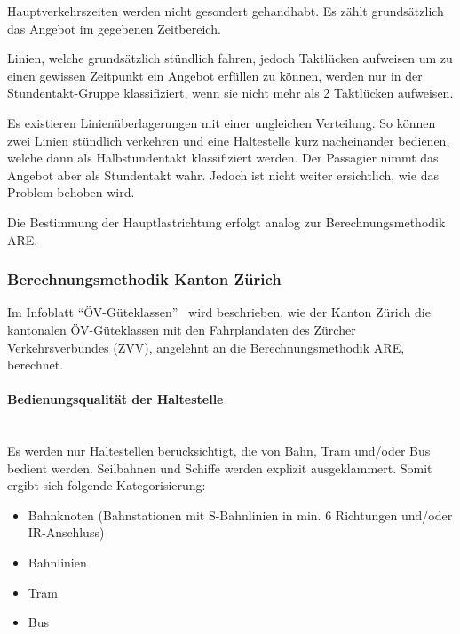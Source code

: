 Hauptverkehrszeiten werden nicht gesondert gehandhabt.
Es zählt grundsätzlich das Angebot im gegebenen Zeitbereich.

Linien, welche grundsätzlich stündlich fahren, jedoch Taktlücken aufweisen um zu einen gewissen Zeitpunkt ein Angebot erfüllen zu können, werden nur in der Stundentakt-Gruppe klassifiziert, wenn sie nicht mehr als 2 Taktlücken aufweisen.

Es existieren Linienüberlagerungen mit einer ungleichen Verteilung.
So können zwei Linien stündlich verkehren und eine Haltestelle kurz nacheinander bedienen, welche dann als Halbstundentakt klassifiziert werden.
Der Passagier nimmt das Angebot aber als Stundentakt wahr.
Jedoch ist nicht weiter ersichtlich, wie das Problem behoben wird.

Die Bestimmung der Hauptlastrichtung erfolgt analog zur Berechnungsmethodik ARE.


\subsubsection{Berechnungsmethodik Kanton Zürich}
\label{Lösungsansätze:Berechnungsmethodik Kanton Zürich}
Im Infoblatt "`ÖV-Güteklassen"'~\cite{oev-guteklassen-zh} wird beschrieben, wie der Kanton Zürich die kantonalen ÖV-Güteklassen mit den Fahrplandaten des Zürcher Verkehrsverbundes (ZVV), angelehnt an die Berechnungsmethodik \acs{ARE}, berechnet.

\paragraph{Bedienungsqualität der Haltestelle}~\\
\label{Berechnungsmethodik Kanton Zürich:Bedienungsqualität der Haltestelle}
Es werden nur Haltestellen berücksichtigt, die von Bahn, Tram und/oder Bus bedient werden.
Seilbahnen und Schiffe werden explizit ausgeklammert.
Somit ergibt sich folgende Kategorisierung:
\begin{itemize}
    \itemsep -1.5em
    \item Bahnknoten (Bahnstationen mit S-Bahnlinien in min. 6 Richtungen und/oder IR-Anschluss)
    \item Bahnlinien
    \item Tram
    \item Bus
\end{itemize}

